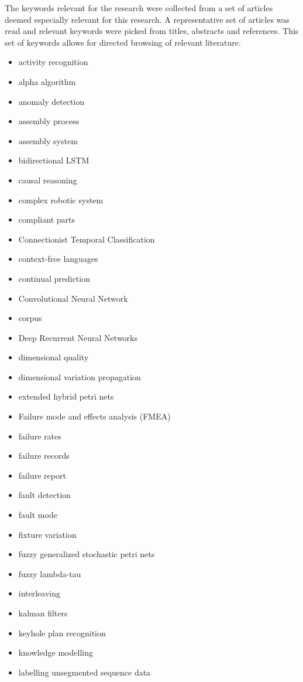 \documentclass[a4paper,10pt]{article}
\begin{document}
The keywords relevant for the research were collected from a set of articles deemed especially relevant for this research. A representative set of articles was
read and relevant keywords were picked from titles, abstracts and references. This set of keywords allows for directed browsing of relevant literature.

\begin{itemize}
 \item activity recognition
 \item alpha algorithm
 \item anomaly detection
 \item assembly process
 \item assembly system
 \item bidirectional LSTM
 \item causal reasoning
 \item complex robotic system
 \item compliant parts
 \item Connectionist Temporal Classification
 \item context-free languages
 \item continual prediction
 \item Convolutional Neural Network
 \item corpus
 \item Deep Recurrent Neural Networks
 \item dimensional quality
 \item dimensional variation propagation
 \item extended hybrid petri nets
 \item Failure mode and effects analysis (FMEA)
 \item failure rates
 \item failure records
 \item failure report
 \item fault detection
 \item fault mode
 \item fixture variation
 \item fuzzy generalized stochastic petri nets
 \item fuzzy lambda-tau
 \item interleaving
 \item kalman filters
 \item keyhole plan recognition
 \item knowledge modelling
 \item labelling unsegmented sequence data

\end{itemize}
\end{document}
